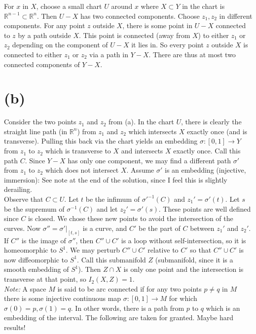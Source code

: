 \documentclass{amsbook}
\theoremstyle{theorem}
\theoremstyle{plain}
\theoremstyle{remark}
\newcommand{\R}{\mathbb R}
\begin{document}
For $x$ in $X$, choose a small chart $U$ around $x$ where $X\subset Y$ in the chart is $\R^{n-1}\subset \R^n$. Then $U-X$ has two connected components. Choose $z_1, z_2$ in different components. For any point $z$ outside $X$, there is some point in $U-X$ connected to $z$ by a path outside $X$. This point is connected (away from $X$) to either $z_1$ or $z_2$ depending on the component of $U-X$ it lies in. So every point $z$ outside $X$ is connected to either $z_1$ or $z_2$ via a path in $Y - X$. There are thus at most two connected components of $Y-X$.

\section*{(b)}

Consider the two points $z_1$ and $z_2$ from (a). In the chart $U$, there is clearly the straight line path (in $\R^n$) from $z_1$ and $z_2$ which intersects $X$ exactly once (and is transverse). Pulling this back via the chart yields an embedding $\sigma:[0,1] \to Y$ from $z_1$ to $z_2$ which is transverse to $X$ and intersects $X$ exactly once. Call this path $C$. Since $Y-X$ has only one component, we may find a different path $\sigma'$ from $z_1$ to $z_2$ which does not intersect $X$. Assume $\sigma'$ is an embedding (injective, immersion): See note at the end of the solution, since I feel this is slightly derailing. \\

Observe that $C\subset U$. Let $t$ be the infimum of $\sigma'^{-1}(C)$ and $z_1' = \sigma'(t)$. Let $s$ be the supremum of $\sigma^{-1}(C)$ and let $z_2' = \sigma'(s)$. These points are well defined since $C$ is closed. We chose these new points to avoid the intersection of the curves. Now $\sigma'' = \sigma'|_{[t,s]}$ is a curve, and $C'$ be the part of $C$ between $z_1'$ and $z_2'$. If $C''$ is the image of $\sigma''$, then $C'' \cup C'$ is a loop without self-intersection, so it is homeomorphic to $S^1$. We may perturb $C''\cup C'$  relative to $C'$ so that $C'' \cup C'$ is now diffeomorphic to $S^1$. Call this submanifold $Z$ (submanifold, since it is a smooth embedding of $S^1$). Then $Z\cap X$ is only one point and the intersection is transverse at that point, so $I_2(X,Z) = 1$.\\

\textit{Note:} A space $M$ is said to be arc connected if for any two points $p\neq q$ in $M$ there is some injective continuous map $\sigma: [0,1] \to M$ for which $\sigma(0) = p, \sigma (1) = q$. In other words, there is a path from $p$ to $q$ which is an embedding of the interval. The following are taken for granted. Maybe hard results!
\end{document}

